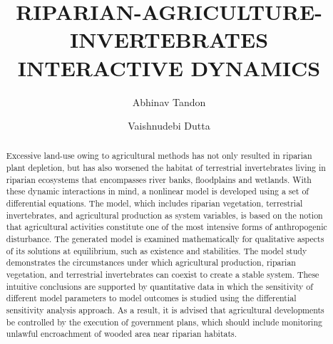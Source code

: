 \documentclass[12pt]{article}
\author[1]{Abhinav Tandon}
\author[2]{Vaishnudebi Dutta}
\affil[1]{Corresponding Author\thanks{abhinav.abhi02@gmail.com}}
\affil[1,2]{Birla Institute of Technology Mesra, Ranchi - 835215, Jharkhand, INDIA}
\title{RIPARIAN-AGRICULTURE-INVERTEBRATES INTERACTIVE DYNAMICS}
\numberwithin{equation}{section}
\begin{document}
\maketitle
\vspace{-1cm}
\begin{abstract}
Excessive land-use owing to agricultural methods has not only resulted in riparian plant depletion, but has also worsened the habitat of terrestrial invertebrates living in riparian ecosystems that encompasses river banks, floodplains and wetlands. With these dynamic interactions in mind, a nonlinear model is developed using a set of differential equations. The model, which includes riparian vegetation, terrestrial invertebrates, and agricultural production as system variables, is based on the notion that agricultural activities constitute one of the most intensive forms of anthropogenic disturbance. The generated model is examined mathematically for qualitative aspects of its solutions at equilibrium, such as existence and stabilities. The model study demonstrates the circumstances under which agricultural production, riparian vegetation, and terrestrial invertebrates can coexist to create a stable system. These intuitive conclusions are supported by quantitative data in which the sensitivity of different model parameters to model outcomes is studied using the differential sensitivity analysis approach. As a result, it is advised that agricultural developments be controlled by the execution of government plans, which should include monitoring unlawful encroachment of wooded area near riparian habitats. 
\end{abstract}
\end{document}
